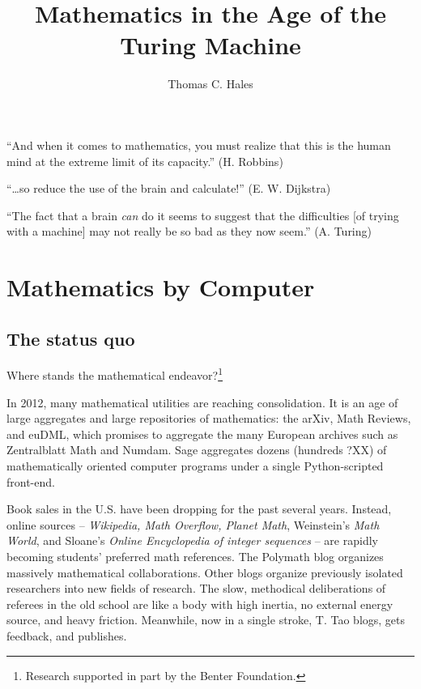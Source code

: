 \documentclass{llncs}
\begin{document}
\title{Mathematics in the Age of the Turing Machine}
\author{Thomas C. Hales}
\maketitle


\section*{}

{

\narrower

\it

``And when it comes to mathematics, you must realize that this is the human mind
at the extreme limit of its capacity.'' (H. Robbins) 

\smallskip
\noindent
``\ldots so reduce the use of
the brain and calculate!'' (E. W. Dijkstra)  

\smallskip
\noindent
``The fact that a brain {\it can} do it seems to suggest that the
difficulties [of trying with a machine] may not really be so bad as they now
seem.''  (A. Turing)

}


\section{Mathematics by Computer}

\subsection{The status quo}

Where stands the mathematical endeavor?\footnote{Research supported in part by the Benter Foundation.}

In 2012, many mathematical utilities are reaching consolidation.  It
is an age of large aggregates and large repositories of mathematics:
the arXiv, Math Reviews, and euDML, which promises to aggregate the
many European archives such as Zentralblatt Math and Numdam.  Sage
aggregates dozens (hundreds ?XX) of mathematically oriented computer
programs under a single Python-scripted front-end.


Book sales in the U.S. have been dropping  for the past several years. 
Instead, online sources -- {\it Wikipedia, Math Overflow, Planet
  Math}, Weinstein's {\it Math World}, and Sloane's {\it Online
  Encyclopedia of integer sequences} -- are rapidly becoming students'
preferred math references. The Polymath blog organizes massively
mathematical collaborations.  Other blogs organize previously isolated
researchers into new fields of research.  The slow, methodical
deliberations of referees in the old school are like a body with high
inertia, no external energy source, and heavy friction.  Meanwhile,
now in a single stroke, T. Tao blogs, gets feedback, and publishes.
\end{document}
